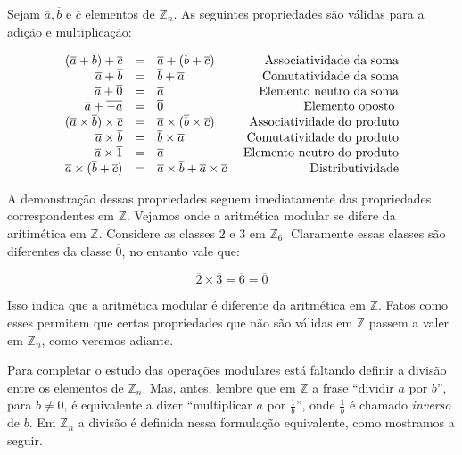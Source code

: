 Sejam $\overline{a}, \overline{b}$ e $\overline{c}$ elementos de $\mathbb{Z}_{n}$. 
As seguintes propriedades s\~{a}o v\'{a}lidas para a adi\c{c}\~{a}o e multiplica\c{c}\~{a}o:

\[
\begin{array}{rclr}
(\overline{a}+\overline{b})+\overline{c} &=& \overline{a}+(\overline{b}+\overline{c}) & \hfill\textrm{ Associatividade da soma}\\
\overline{a}+\overline{b}									 &=& \overline{b}+\overline{a} 								& \hfill\textrm{ Comutatividade da soma}\\
\overline{a}+\overline{0} 							 &=& \overline{a} 														& \hfill\textrm{ Elemento neutro da soma}\\
\overline{a}+\overline{-a}							 &=& \overline{0} 														& \hfill\textrm{ Elemento oposto }\\
(\overline{a}\times\overline{b})\times\overline{c} &=& \overline{a}\times(\overline{b}\times\overline{c}) & \hfill\textrm{ Associatividade do produto}\\
\overline{a}\times\overline{b}								 &=& \overline{b}\times\overline{a} 								& \hfill\textrm{ Comutatividade do produto}\\
\overline{a}\times\overline{1} 							 &=& \overline{a} 														& \hfill\textrm{ Elemento neutro do produto}\\
\overline{a}\times(\overline{b}+\overline{c})&=& \overline{a}\times\overline{b}+\overline{a}\times\overline{c} 														& \hfill\textrm{ Distributividade}\\
\end{array}
\]

A demonstra\c{c}\~{a}o dessas propriedades seguem imediatamente das propriedades correspondentes em $\mathbb{Z}$.
Vejamos onde a aritm\'{e}tica modular se difere da aritim\'{e}tica em $\mathbb{Z}$. Considere as classes 
$\overline{2}$ e $\overline{3}$ em $\mathbb{Z}_{6}$. Claramente essas classes s\~{a}o diferentes
da classe $\overline{0}$, no entanto vale que:

$$\overline{2}\times\overline{3}=\overline{6}=\overline{0}$$
 
Isso indica que a aritm\'{e}tica modular \'{e} diferente da aritm\'{e}tica em $\mathbb{Z}$. Fatos como esses 
permitem que certas propriedades que n\~{a}o s\~{a}o v\'{a}lidas em $\mathbb{Z}$ passem a valer em $\mathbb{Z}_{n}$, como veremos 
adiante. 

Para completar o estudo das opera\c{c}\~{o}es modulares est\'{a} faltando definir a divis\~{a}o entre os elementos de $\mathbb{Z}_{n}$.
Mas, antes, lembre que em $\mathbb{Z}$ a frase ``dividir $a$ por $b$'', para $b\neq 0$, \'{e} equivalente a dizer
``multiplicar $a$ por $\frac{1}{b}$'', onde $\frac{1}{b}$ \'{e} chamado \textit{inverso} de $b$. 
Em $\mathbb{Z}_{n}$ a divis\~{a}o \'{e} definida nessa formula\c{c}\~{a}o equivalente, como mostramos a seguir. 

